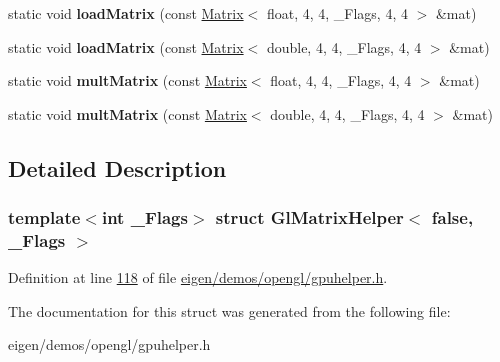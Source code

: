 \begin{DoxyCompactItemize}
static void {\bfseries load\+Matrix} (const \hyperlink{group___core___module_class_eigen_1_1_matrix}{Matrix}$<$ float, 4, 4, \+\_\+\+Flags, 4, 4 $>$ \&mat)
\item 
\mbox{\label{struct_gl_matrix_helper_3_01false_00_01___flags_01_4_a7837d8a3fba513a90288f95579ef0dd9}} 
static void {\bfseries load\+Matrix} (const \hyperlink{group___core___module_class_eigen_1_1_matrix}{Matrix}$<$ double, 4, 4, \+\_\+\+Flags, 4, 4 $>$ \&mat)
\item 
\mbox{\label{struct_gl_matrix_helper_3_01false_00_01___flags_01_4_a68cee8cc7891123d546c06be2890e994}} 
static void {\bfseries mult\+Matrix} (const \hyperlink{group___core___module_class_eigen_1_1_matrix}{Matrix}$<$ float, 4, 4, \+\_\+\+Flags, 4, 4 $>$ \&mat)
\item 
\mbox{\label{struct_gl_matrix_helper_3_01false_00_01___flags_01_4_a32bb759b3d2bb2f973c37e40fc5b8785}} 
static void {\bfseries mult\+Matrix} (const \hyperlink{group___core___module_class_eigen_1_1_matrix}{Matrix}$<$ double, 4, 4, \+\_\+\+Flags, 4, 4 $>$ \&mat)
\end{DoxyCompactItemize}


\subsection{Detailed Description}
\subsubsection*{template$<$int \+\_\+\+Flags$>$\newline
struct Gl\+Matrix\+Helper$<$ false, \+\_\+\+Flags $>$}



Definition at line \hyperlink{eigen_2demos_2opengl_2gpuhelper_8h_source_l00118}{118} of file \hyperlink{eigen_2demos_2opengl_2gpuhelper_8h_source}{eigen/demos/opengl/gpuhelper.\+h}.



The documentation for this struct was generated from the following file\+:\begin{DoxyCompactItemize}
\item 
eigen/demos/opengl/gpuhelper.\+h\end{DoxyCompactItemize}
